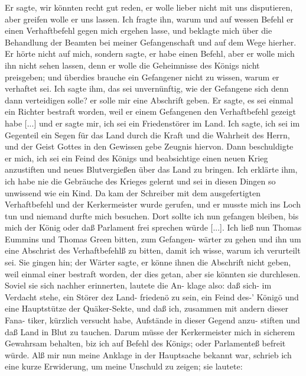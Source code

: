 Er sagte, wir könnten recht gut reden, er wolle
lieber nicht mit uns disputieren, aber greifen wolle er uns lassen. Ich
fragte ihn, warum und auf wessen Befehl er einen Verhaftbefehl
gegen mich ergehen lasse, und beklagte mich über die Behandlung
der Beamten bei meiner Gefangenschaft und auf dem Wege
hierher. Er hörte nicht auf mich, sondern sagte, er habe einen
Befehl, aber er wolle mich ihn nicht sehen lassen, denn er
wolle die Geheimnisse des Königs nicht preisgeben; und überdies 
brauche ein Gefangener nicht zu wissen, warum er verhaftet 
sei. Ich sagte ihm, das sei unvernünftig, wie der Gefangene 
sich denn dann verteidigen solle? er solle mir eine Abschrift
geben. Er sagte, es sei einmal ein Richter bestraft worden, weil
er einem Gefangenen den Verhaftbefehl gezeigt habe [...] und
er sagte mir, ich sei ein Friedenstörer im Land. Ich sagte, ich
sei im Gegenteil ein Segen für das Land durch die Kraft und
die Wahrheit des Herrn, und der Geist Gottes in den Gewissen
gebe Zeugnis hiervon. Dann beschuldigte er mich, ich sei ein
Feind des Königs und beabsichtige einen neuen Krieg anzustiften
und neues Blutvergießen über das Land zu bringen. Ich erklärte
ihm, ich habe nie die Gebräuche des Krieges gelernt und sei in
diesen Dingen so unwissend wie ein Kind. Da kam der Schreiber
mit dem ausgefertigten Verhaftbefehl und der Kerkermeister wurde
gerufen, und er musste mich ins Loch tun und niemand durfte
mich besuchen. Dort sollte ich nun gefangen bleiben, bis mich der
König oder daß Parlament frei sprechen würde [...]. Ich ließ
nun Thomas Eummins und Thomas Green bitten, zum Gefangen-
wärter zu gehen und ihn um eine Abschrist des Verhaftbefehlß zu
bitten, damit ich wisse, warum ich verurteilt sei. Sie gingen hin;
der Wärter sagte, er könne ihnen die Abschrift nicht geben, weil
einmal einer bestraft worden, der dies getan, aber sie könnten sie
durchlesen. Soviel sie sich nachher erinnerten, lautete die An-
klage also: daß sich- im Verdacht stehe, ein Störer dez Land-
friedenö zu sein, ein Feind des-’ Königö und eine Hauptstütze der
Quäker-Sekte, und daß ich, zusammen mit andern dieser Fana-
tiker, kürzlich versucht habe, Aufstände in dieser Gegend anzu-
stiften und daß Land in Blut zu tauchen. Darum müsse der
Kerkermeister mich in sicherem Gewahrsam behalten, biz ich auf
Befehl des Königs; oder Parlamenteß befreit würde.
Alß mir nun meine Anklage in der Hauptsache bekannt war,
schrieb ich eine kurze Erwiderung, um meine Unschuld zu zeigen;
sie lautete:

